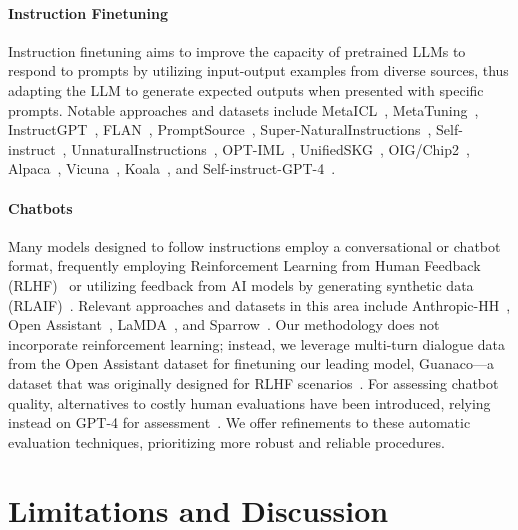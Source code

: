 \paragraph{Instruction Finetuning} Instruction finetuning aims to improve the capacity of pretrained LLMs to respond to prompts by utilizing input-output examples from diverse sources, thus adapting the LLM to generate expected outputs when presented with specific prompts. Notable approaches and datasets include MetaICL~\citep{min2021metaicl}, MetaTuning~\citep{zhong2021adapting}, InstructGPT~\citep{ouyang2022training}, FLAN~\citep{wei2021finetuned,chung2022scaling}, PromptSource~\citep{bach2022promptsource}, Super-NaturalInstructions~\citep{wang2022super,sanh2021multitask}, Self-instruct~\citep{wang2022self}, UnnaturalInstructions~\citep{honovich2022unnatural}, OPT-IML~\citep{iyer2022opt}, UnifiedSKG~\citep{xie2022unifiedskg}, OIG/Chip2~\citep{laion2023}, Alpaca~\citep{alpaca}, Vicuna~\citep{vicuna2023}, Koala~\citep{koala_blogpost_2023}, and Self-instruct-GPT-4~\citep{peng2023instruction}.

\paragraph{Chatbots} Many models designed to follow instructions employ a conversational or chatbot format, frequently employing Reinforcement Learning from Human Feedback (RLHF)~\citep{christiano2017deep} or utilizing feedback from AI models by generating synthetic data (RLAIF)~\citep{bai2022constitutional}. Relevant approaches and datasets in this area include Anthropic-HH~\citep{askell2021general,bai2022training}, Open Assistant~\citep{kopf2023openassistant}, LaMDA~\citep{thoppilan2022lamda}, and Sparrow~\citep{glaese2022improving}. Our methodology does not incorporate reinforcement learning; instead, we leverage multi-turn dialogue data from the Open Assistant dataset for finetuning our leading model, Guanaco—a dataset that was originally designed for RLHF scenarios~\citep{kopf2023openassistant}. For assessing chatbot quality, alternatives to costly human evaluations have been introduced, relying instead on GPT-4 for assessment~\citep{vicuna2023,peng2023instruction}. We offer refinements to these automatic evaluation techniques, prioritizing more robust and reliable procedures.

\section{Limitations and Discussion}

